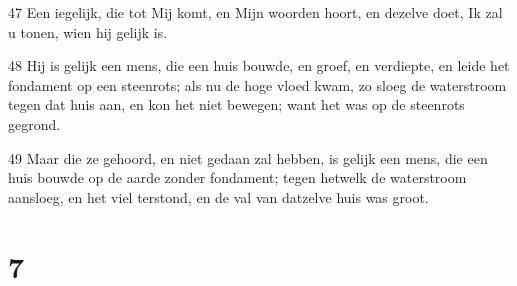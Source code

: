 \par 47 Een iegelijk, die tot Mij komt, en Mijn woorden hoort, en dezelve doet, Ik zal u tonen, wien hij gelijk is.
\par 48 Hij is gelijk een mens, die een huis bouwde, en groef, en verdiepte, en leide het fondament op een steenrots; als nu de hoge vloed kwam, zo sloeg de waterstroom tegen dat huis aan, en kon het niet bewegen; want het was op de steenrots gegrond.
\par 49 Maar die ze gehoord, en niet gedaan zal hebben, is gelijk een mens, die een huis bouwde op de aarde zonder fondament; tegen hetwelk de waterstroom aansloeg, en het viel terstond, en de val van datzelve huis was groot.

\chapter{7}

